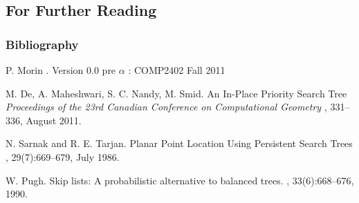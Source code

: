 \documentclass{beamer}
\begin{document}
\subsection*{For Further Reading}

\begin{frame}
  \frametitle<presentation>{Bibliography}

  \begin{thebibliography}{10}
    
  \beamertemplatebookbibitems

    P. Morin
    .
    \newblock Version 0.0 pre $\alpha$ : COMP2402 Fall 2011
    
  \beamertemplatearticlebibitems

    M. De, A. Maheshwari, S. C. Nandy, M. Smid.
    \newblock An In-Place Priority Search Tree
    \newblock
    {
      \em Proceedings of the 23rd Canadian Conference on Computational Geometry
    },
    331--336, August 2011.

    N. Sarnak and R. E. Tarjan.
    \newblock Planar Point Location Using Persistent Search Trees
    ,
    29(7):669--679, July 1986.

    W. Pugh.
    \newblock Skip lists: A probabilistic alternative to balanced trees.
    ,
    33(6):668--676, 1990.

  \end{thebibliography}
\end{frame}
\end{document}
